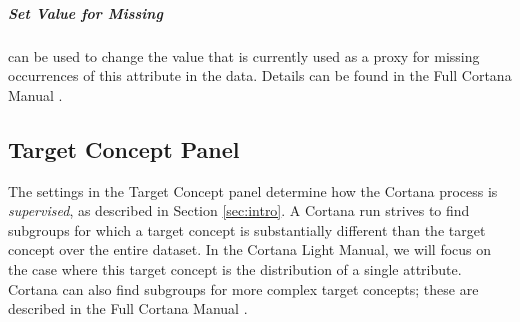 \documentclass{article}
\newcommand{\todo}[1]{\textcolor{red}{[TODO: #1]}}
\begin{document}
\subparagraph{Set Value for Missing} can be used to change the value that is
currently used as a proxy for missing occurrences of this attribute in the
data. Details can be found in the Full Cortana Manual \cite{full}.


\subsection{Target Concept Panel}
\label{sec:targetconcept}

The settings in the Target Concept panel determine how the Cortana process
is \emph{supervised}, as described in Section \ref{sec:intro}.  A Cortana
run strives to find subgroups for which a target concept is substantially
different than the target concept over the entire dataset.  In the Cortana
Light Manual, we will focus on the case where this target concept is the
distribution of a single attribute.  Cortana can also find subgroups for
more complex target concepts; these are described in the Full Cortana
Manual \cite{full}.
\end{document}
